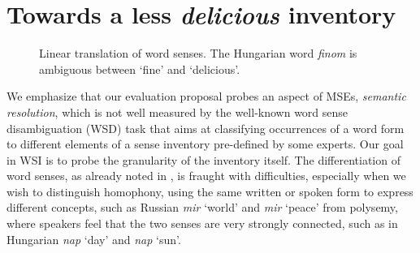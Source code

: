 \documentclass[11pt]{article}
\begin{document}
\section{Towards a less \emph{delicious} inventory}

\label{sec:delicious}

\begin{figure}
    \centering
    \resizebox{\columnwidth}{!} {
    }
    \caption{Linear translation of word senses. The Hungarian word
        \emph{finom} is ambiguous between `fine' and `delicious'.}
        \label{fig:AdaGram}
\end{figure}


We emphasize that our evaluation proposal probes an aspect of MSEs,
\emph{semantic resolution}, which is not well measured by the well-known word
sense disambiguation (WSD) task that aims at classifying occurrences of a word
form to different elements of a sense inventory pre-defined by some experts.
Our goal in WSI is to probe the granularity of the inventory itself.  The
differentiation of word senses, as already noted in \cite{Borbely:2016}, is
fraught with difficulties, especially when we wish to distinguish homophony,
using the same written or spoken form to express different concepts, such as
Russian {\it mir} `world' and {\it mir} `peace' from polysemy, where speakers
feel that the two senses are very strongly connected, such as in Hungarian {\it
nap} `day' and {\it nap} `sun'.
\end{document}
